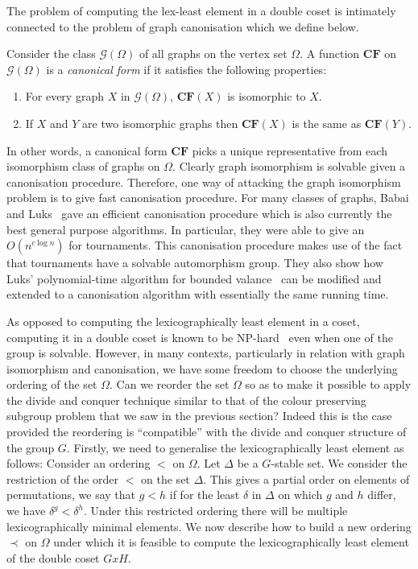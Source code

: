 \documentclass{article}
\begin{document}
The problem of computing the lex-least element in a double coset is
intimately connected to the problem of graph canonisation which we
define below.

\begin{definition}
  Consider the class $\mathcal{G}(\Omega)$ of all graphs on the vertex
  set $\Omega$. A function $\mathbf{CF}$ on $\mathcal{G}(\Omega)$ is a
  \emph{canonical form} if it satisfies the following properties:
  \begin{enumerate}
  \item For every graph $X$ in $\mathcal{G}(\Omega)$, $\mathbf{CF}(X)$
    is isomorphic to $X$.
  \item If $X$ and $Y$ are two isomorphic graphs then $\mathbf{CF}(X)$
    is the same as $\mathbf{CF}(Y)$.
  \end{enumerate}
\end{definition}

In other words, a canonical form $\mathbf{CF}$ picks a unique
representative from each isomorphism class of graphs on
$\Omega$. Clearly graph isomorphism is solvable given a canonisation
procedure. Therefore, one way of attacking the graph isomorphism
problem is to give fast canonisation procedure. For many classes of
graphs, Babai and Luks~\cite{babai83canonical} gave an efficient
canonisation procedure which is also currently the best general
purpose algorithms. In particular, they were able to give an
$O\left(n^{c \log{n}}\right)$ for tournaments. This canonisation
procedure makes use of the fact that tournaments have a solvable
automorphism group. They also show how Luks' polynomial-time algorithm
for bounded valance~\cite{luks82bounded} can be modified and extended
to a canonisation algorithm with essentially the same running time.

As opposed to computing the lexicographically least element in a
coset, computing it in a double coset is known to be
NP-hard~\cite[Theorem 5.1]{luks93permutation} even when one of the
group is solvable. However, in many contexts, particularly in relation
with graph isomorphism and canonisation, we have some freedom to
choose the underlying ordering of the set $\Omega$. Can we reorder the
set $\Omega$ so as to make it possible to apply the divide and conquer
technique similar to that of the colour preserving subgroup problem
that we saw in the previous section?  Indeed this is the case provided
the reordering is ``compatible'' with the divide and conquer structure
of the group $G$. Firstly, we need to generalise the lexicographically
least element as follows: Consider an ordering $<$ on $\Omega$. Let
$\Delta$ be a $G$-stable set. We consider the restriction of the order
$<$ on the set $\Delta$. This gives a partial order on elements of
permutations, we say that $g < h$ if for the least $\delta$ in
$\Delta$ on which $g$ and $h$ differ, we have $\delta^g <
\delta^h$. Under this restricted ordering there will be multiple
lexicographically minimal elements. We now describe how to build a new
ordering $\prec$ on $\Omega$ under which it is feasible to compute the
lexicographically least element of the double coset $GxH$.
\end{document}
